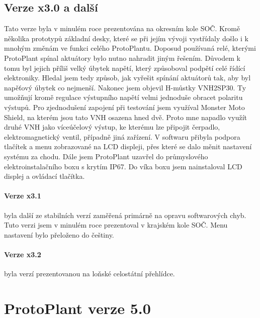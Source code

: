 \subsection{Verze x3.0 a další}
Tato verze byla v minulém roce prezentována na okresním kole SOČ.
Kromě několika prototypů základní desky, které se při jejím vývoji vystřídaly došlo i k mnohým změnám ve funkci celého ProtoPlantu.
Doposud používaná relé, kterými ProtoPlant spínal aktuátory bylo nutno nahradit jiným řešením.
Důvodem k tomu byl jejich příliš velký úbytek napětí, který způsoboval podpětí celé řídící elektroniky.
Hledal jsem tedy způsob, jak vyřešit spínání aktuátorů tak, aby byl napěťový úbytek co nejmenší.
Nakonec jsem objevil H-můstky VNH2SP30. 
Ty umožňují kromě regulace výstupního napětí velmi jednoduše obracet polaritu výstupů.
Pro zjednodušení zapojení při testování jsem využíval Monster Moto Shield, na kterém jsou tato VNH osazena hned dvě.
Proto mne napadlo využít druhé VNH jako víceúčelový výstup, ke kterému lze připojit čerpadlo, elektromagnetický ventil, případně jiná zařízení.
V softwaru přibyla podpora tlačítek a menu zobrazované na LCD displeji, přes které se dalo měnit nastavení systému za chodu.
Dále jsem ProtoPlant uzavřel do průmyslového elektroinstalačního boxu s krytím IP67.
Do víka boxu jsem nainstaloval LCD displej a ovládací tlačítka.

\paragraph{Verze x3.1}
byla další ze stabilních verzí zaměřená primárně na opravu softwarových chyb.
Tuto verzi jsem v minulém roce prezentoval v krajském kole SOČ.
Menu nastavení bylo přeloženo do češtiny.

\paragraph{Verze x3.2}
byla verzí prezentovanou na loňské celostátní přehlídce.

\section{ProtoPlant verze 5.0}


\newpage
